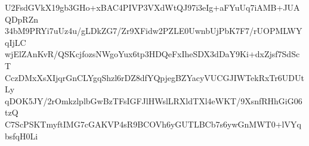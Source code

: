 U2FsdGVkX19gb3GHo+xBAC4PIVP3VXdWtQJ97i3eIg+aFYuUq7iAMB+JUAQDpRZn
34bM9PRYi7uUz4u/gLDkZG7/Zr9XFidw2PZLE0UwnbUjPbK7F7/rUOPMLWYqIjLC
wjElZAnKvR/QSKcjfozsNWgoYux6tp3HDQeFxIheSDX3dDaY9Ki+dxZjsf7SdScT
CczDMxXsXIjqrGnCLYgqShzl6rDZ8dfYQpjegBZYacyVUCGJIWTekRxTr6UDUtLy
qDOK5JY/2rOmkzlplbGwBzTFsIGFJlHWslLRXldTXl4eWKT/9XsnfRHhGiG06tzQ
C7ScPSKTmyftIMG7cGAKVP4sR9BCOVh6yGUTLBCb7s6ywGnMWT0+lVYqbsfqH0Li
